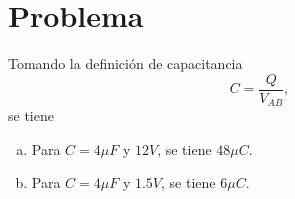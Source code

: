 \section*{Problema}

Tomando la definición de capacitancia
	$$ C = \frac{Q}{V_{AB}}, $$
se tiene
	\begin{enumerate}[a)]
		\item Para $C = 4\mu F$ y $12V$, se tiene $48\mu C$.
		\item Para $C = 4\mu F$ y $1.5V$, se tiene $6\mu C$.
	\end{enumerate}









